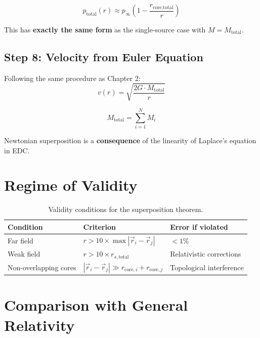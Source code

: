 \documentclass[12pt,a4paper,openany]{book}
\theoremstyle{definition}
\theoremstyle{plain}
\theoremstyle{remark}
\newcommand{\pinfty}{p_\infty}             %
\begin{document}
\begin{equation}
p_{\text{total}}(r) \approx \pinfty\left(1 - \frac{r_{\text{core,total}}}{r}\right)
\label{eq:p_farfield}
\end{equation}

This has \textbf{exactly the same form} as the single-source case with $M = M_{\text{total}}$.

\subsection{Step 8: Velocity from Euler Equation}

Following the same procedure as Chapter 2:
\begin{equation}
v(r) = \sqrt{\frac{2G \cdot M_{\text{total}}}{r}}
\label{eq:v_superposition}
\end{equation}

\begin{derivedbox}
\begin{equation}
\boxed{M_{\text{total}} = \sum_{i=1}^{N} M_i}
\end{equation}

Newtonian superposition is a \textbf{consequence} of the linearity of Laplace's equation in EDC.
\end{derivedbox}

\section{Regime of Validity}

\begin{table}[H]
\centering
\begin{tabular}{|l|l|l|}
\hline
\textbf{Condition} & \textbf{Criterion} & \textbf{Error if violated} \\
\hline
Far field & $r > 10 \times \max|\vec{r}_i - \vec{r}_j|$ & $< 1\%$ \\
Weak field & $r > 10 \times r_{s,\text{total}}$ & Relativistic corrections \\
Non-overlapping cores & $|\vec{r}_i - \vec{r}_j| \gg r_{\text{core},i} + r_{\text{core},j}$ & Topological interference \\
\hline
\end{tabular}
\caption{Validity conditions for the superposition theorem.}
\end{table}

\section{Comparison with General Relativity}
\end{document}
